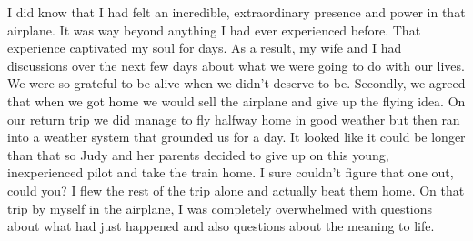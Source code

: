 \documentclass[twoside, 12pt]{book}
\begin{document}
I did know that I had felt an incredible, extraordinary presence and power in that airplane. It was way beyond anything I had ever experienced before. That experience captivated my soul for days. As a result, my wife and I had discussions over the next few days about what we were going to do with our lives. We were so grateful to be alive when we didn't deserve to be. Secondly, we agreed that when we got home we would sell the airplane and give up the flying idea. On our return trip we did manage to fly halfway home in good weather but then ran into a weather system that grounded us for a day. It looked like it could be longer than that so Judy and her parents decided to give up on this young, inexperienced pilot and take the train home. I sure couldn't figure that one out, could you? I flew the rest of the trip alone and actually beat them home. On that trip by myself in the airplane, I was completely overwhelmed with questions about what had just happened and also questions about the meaning to life.
\end{document}
